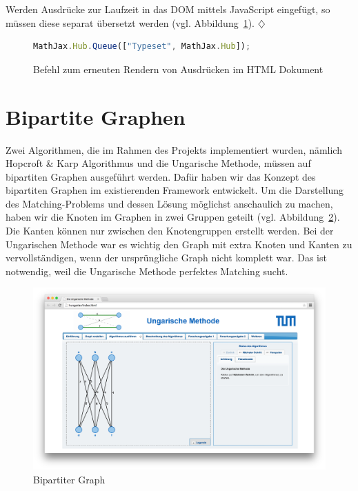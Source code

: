 Werden Ausdrücke zur Laufzeit in das DOM mittels JavaScript eingefügt, so müssen diese separat übersetzt werden (vgl. Abbildung~\ref{fig:listing-mathjax-render}). \hfill$\diamondsuit$

\begin{figure}[h!]
\begin{lstlisting}[language=JavaScript]
MathJax.Hub.Queue(["Typeset", MathJax.Hub]);
\end{lstlisting}
\caption[MathJAX: Render Befehl]{Befehl zum erneuten Rendern von Ausdrücken im HTML Dokument}\label{fig:listing-mathjax-render}
\end{figure}

\section{Bipartite Graphen} %
Zwei Algorithmen, die im Rahmen des Projekts implementiert wurden, nämlich Hopcroft \& Karp Algorithmus und die Ungarische Methode, müssen auf bipartiten Graphen ausgeführt werden. Dafür haben wir das Konzept des bipartiten Graphen im existierenden Framework entwickelt. Um die Darstellung des Matching-Problems und dessen Lösung möglichst anschaulich zu machen, haben wir die Knoten im Graphen in zwei Gruppen geteilt (vgl. Abbildung~\ref{fig:hungarian-bipartite}). Die Kanten können nur zwischen den Knotengruppen erstellt werden. Bei der Ungarischen Methode war es wichtig den Graph mit extra Knoten und Kanten zu vervollständigen, wenn der ursprüngliche Graph nicht komplett war. Das ist notwendig, weil die Ungarische Methode perfektes Matching sucht.
\begin{figure}[h!]
	\centering
	\includegraphics[width=\textwidth]{figures/hungarian-bipartite}
	\caption[Bipartiter Graph]{Bipartiter Graph}\label{fig:hungarian-bipartite}
\end{figure}

